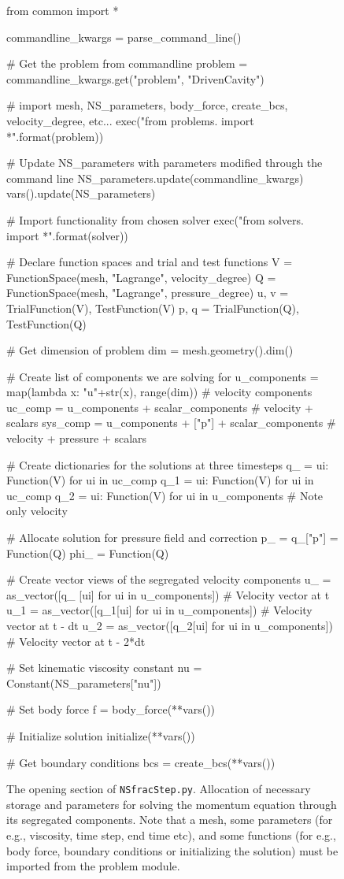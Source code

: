 \documentclass[final,3p,times,twocolumn]{elsarticle}
\newcommand{\inpyth}{\lstinline[style=inlinestyle]} %[]%
\begin{document}
\begin{figure*}
\begin{python}
from common import *

commandline_kwargs = parse_command_line()

# Get the problem from commandline
problem = commandline_kwargs.get("problem", "DrivenCavity")

# import mesh, NS_parameters, body_force, create_bcs, velocity_degree, etc...
exec("from problems.{} import *".format(problem))

# Update NS_parameters with parameters modified through the command line
NS_parameters.update(commandline_kwargs)
vars().update(NS_parameters)

# Import functionality from chosen solver
exec("from solvers.{} import *".format(solver))

# Declare function spaces and trial and test functions
V = FunctionSpace(mesh, "Lagrange", velocity_degree)
Q = FunctionSpace(mesh, "Lagrange", pressure_degree)
u, v = TrialFunction(V), TestFunction(V)
p, q = TrialFunction(Q), TestFunction(Q)

# Get dimension of problem
dim = mesh.geometry().dim()

# Create list of components we are solving for
u_components = map(lambda x: "u"+str(x), range(dim))  # velocity components
uc_comp  =  u_components + scalar_components          # velocity + scalars
sys_comp = u_components + ["p"] + scalar_components   # velocity + pressure + scalars

# Create dictionaries for the solutions at three timesteps
q_  = {ui: Function(V) for ui in uc_comp}
q_1 = {ui: Function(V) for ui in uc_comp}
q_2 = {ui: Function(V) for ui in u_components} # Note only velocity

# Allocate solution for pressure field and correction
p_ = q_["p"] = Function(Q)
phi_ = Function(Q)

# Create vector views of the segregated velocity components
u_  = as_vector([q_ [ui] for ui in u_components]) # Velocity vector at t
u_1 = as_vector([q_1[ui] for ui in u_components]) # Velocity vector at t - dt
u_2 = as_vector([q_2[ui] for ui in u_components]) # Velocity vector at t - 2*dt

# Set kinematic viscosity constant
nu = Constant(NS_parameters["nu"])

# Set body force
f = body_force(**vars())

# Initialize solution
initialize(**vars())

# Get boundary conditions
bcs = create_bcs(**vars())

\end{python}
\caption{The opening section of \inpyth{NSfracStep.py}. Allocation of necessary storage and parameters for solving the momentum equation through its segregated components. Note that a mesh, some parameters (for e.g., viscosity, time step, end time etc), and some functions (for e.g., body force, boundary conditions or initializing the solution)  must be imported from the problem module. }
\label{lst:allocation}
\end{figure*}
\end{document}
